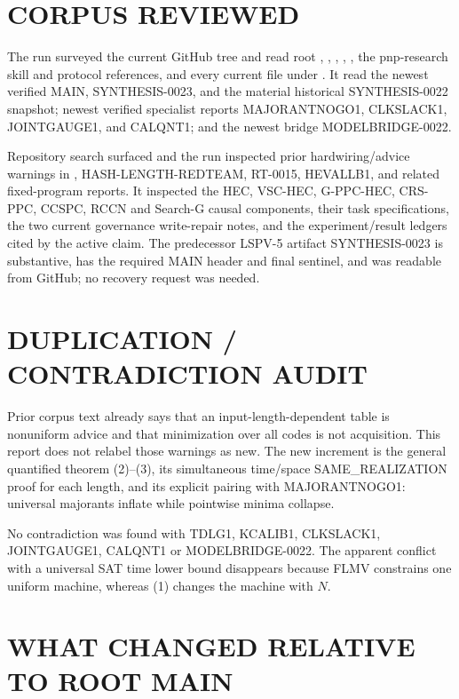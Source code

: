 \documentclass[11pt]{article}
\begin{document}
\section{CORPUS REVIEWED}

The run surveyed the current GitHub tree and read root ,
, , , , the
pnp-research skill and protocol references, and every current file under
.  It read the newest verified MAIN, SYNTHESIS-0023, and the
material historical SYNTHESIS-0022 snapshot; newest verified specialist
reports MAJORANTNOGO1, CLKSLACK1, JOINTGAUGE1, and CALQNT1; and the newest
bridge MODELBRIDGE-0022.

Repository search surfaced and the run inspected prior hardwiring/advice
warnings in , HASH-LENGTH-REDTEAM, RT-0015, HEVALLB1, and
related fixed-program reports.  It inspected the HEC, VSC-HEC, G-PPC-HEC,
CRS-PPC, CCSPC, RCCN and Search-G causal components, their task
specifications, the two current governance write-repair notes, and the
experiment/result ledgers cited by the active claim.  The predecessor LSPV-5
artifact SYNTHESIS-0023 is substantive, has the required MAIN header and
final sentinel, and was readable from GitHub; no recovery request was needed.

\section{DUPLICATION / CONTRADICTION AUDIT}

Prior corpus text already says that an input-length-dependent table is
nonuniform advice and that minimization over all codes is not acquisition.
This report does not relabel those warnings as new.  The new increment is the
general quantified theorem (2)--(3), its simultaneous time/space
SAME\_REALIZATION proof for each length, and its explicit pairing with
MAJORANTNOGO1: universal majorants inflate while pointwise minima collapse.

No contradiction was found with TDLG1, KCALIB1, CLKSLACK1, JOINTGAUGE1,
CALQNT1 or MODELBRIDGE-0022.  The apparent conflict with a universal SAT
time lower bound disappears because FLMV constrains one uniform machine,
whereas (1) changes the machine with \(N\).

\section{WHAT CHANGED RELATIVE TO ROOT MAIN}
\end{document}
